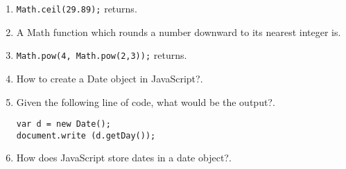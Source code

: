 \documentclass[11pt,a4paper]{article}
\begin{document}
\begin{enumerate}
\item \texttt{Math.ceil(29.89);} returns\underline{\hspace{3cm}}.
\item A Math function which rounds a number downward to its nearest integer is\underline{\hspace{3cm}}.
\item \texttt{Math.pow(4, Math.pow(2,3));} returns\underline{\hspace{3cm}}.
\item How to create a Date object in JavaScript?\underline{\hspace{3cm}}.
\item Given the following line of code, what would be the output?\underline{\hspace{3cm}}.
\begin{lstlisting}
var d = new Date(); 
document.write (d.getDay());
\end{lstlisting}
\item How does JavaScript store dates in a date object?\underline{\hspace{3cm}}.
\end{enumerate}
\end{document}
